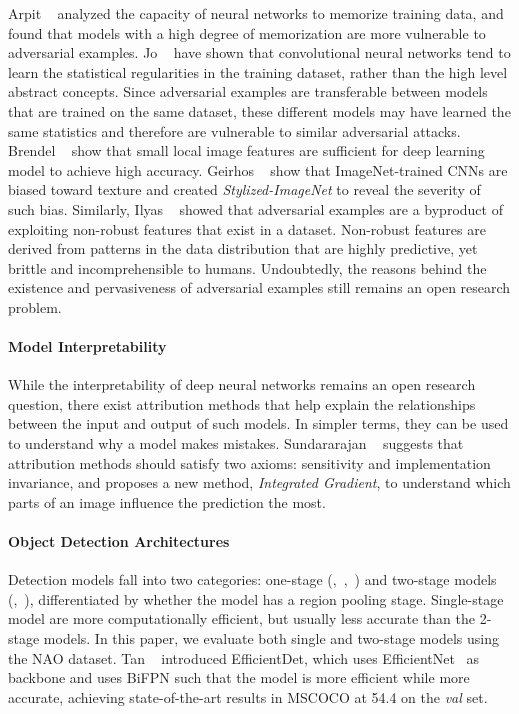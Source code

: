 \documentclass[final]{cvpr}
\begin{document}
Arpit \etal~\cite{pmlr-v70-arpit17a} analyzed the capacity of neural networks to memorize training data, and found that models with a high degree of memorization are more vulnerable to adversarial examples. Jo \etal~\cite{DBLP:journals/corr/abs-1711-11561} have shown that convolutional neural networks tend to learn the statistical regularities in the training dataset, rather than the high level abstract concepts. Since adversarial examples are transferable between models that are trained on the same dataset, these different models may have learned the same statistics and therefore are vulnerable to similar adversarial attacks. Brendel \etal~\cite{brendel2018approximating} show that small local image features are sufficient for deep learning model to achieve high accuracy. Geirhos \etal~\cite{geirhos2018imagenettrained} show that ImageNet-trained CNNs are biased toward texture and created \textit{Stylized-ImageNet} to reveal the severity of such bias. Similarly, Ilyas \etal~\cite{ilyas2019adversarial} showed that adversarial examples are a byproduct of exploiting non-robust features that exist in a dataset. Non-robust features are derived from patterns in the data distribution that are highly predictive, yet brittle and incomprehensible to humans. Undoubtedly, the reasons behind the existence and pervasiveness of adversarial examples still remains an open research problem.





\paragraph{Model Interpretability} While the interpretability of deep neural networks remains an open research question, there exist attribution methods that help explain the relationships between the input and output of such models. In simpler terms, they can be used to understand why a model makes mistakes. Sundararajan \etal~\cite{Sundararajan2017-jl} suggests that attribution methods should satisfy two axioms: sensitivity and implementation invariance, and proposes a new method, \textit{Integrated Gradient}, to understand which parts of an image influence the prediction the most.

\paragraph{Object Detection Architectures} Detection models fall into two categories:  one-stage (\cite{tan2020efficientdet},~\cite{Redmon2018-db},~\cite{redmon2017yolo9000}) and two-stage models (\cite{ren2015faster},~\cite{Sermanet2013-ob}), differentiated by whether the model has a region pooling stage. Single-stage model are more computationally efficient, but usually less accurate than the 2-stage models. In this paper, we evaluate both single and two-stage models using the NAO dataset. Tan \etal~\cite{tan2020efficientdet} introduced EfficientDet, which uses EfficientNet~\cite{Tan2019-sq} as backbone and uses BiFPN such that the model is more efficient while more accurate, achieving state-of-the-art results in MSCOCO at 54.4 on the \textit{val} set.
\end{document}
